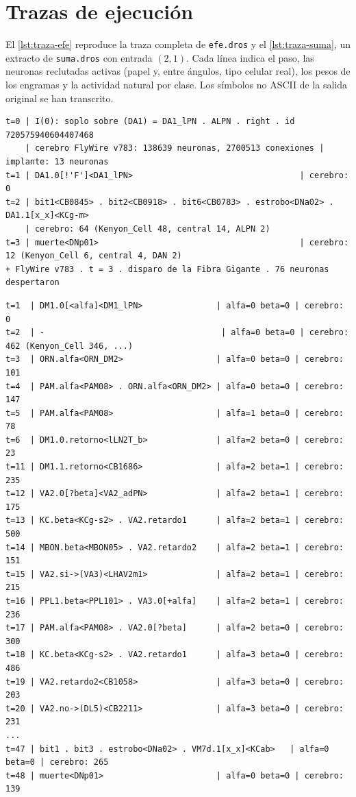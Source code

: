 \documentclass[11pt,a4paper]{article}
\theoremstyle{plain}
\theoremstyle{definition}
\theoremstyle{remark}
\begin{document}
\section{Trazas de ejecución}
\label{app:traza}

El \cref{lst:traza-efe} reproduce la traza completa de \texttt{efe.dros} y el
\cref{lst:traza-suma}, un extracto de \texttt{suma.dros} con entrada $(2,1)$.
Cada línea indica el paso, las neuronas reclutadas activas (papel y, entre
ángulos, tipo celular real), los pesos de los engramas y la actividad natural
por clase. Los símbolos no ASCII de la salida original se han transcrito.

\begin{lstlisting}[caption={Traza completa de \texttt{efe.dros}.},label={lst:traza-efe}]
t=0 | I(0): soplo sobre (DA1) = DA1_lPN . ALPN . right . id 720575940604407468
    | cerebro FlyWire v783: 138639 neuronas, 2700513 conexiones | implante: 13 neuronas
t=1 | DA1.0[!'F']<DA1_lPN>                                  | cerebro: 0
t=2 | bit1<CB0845> . bit2<CB0918> . bit6<CB0783> . estrobo<DNa02> . DA1.1[x_x]<KCg-m>
    | cerebro: 64 (Kenyon_Cell 48, central 14, ALPN 2)
t=3 | muerte<DNp01>                                         | cerebro: 12 (Kenyon_Cell 6, central 4, DAN 2)
+ FlyWire v783 . t = 3 . disparo de la Fibra Gigante . 76 neuronas despertaron
\end{lstlisting}

\begin{lstlisting}[caption={Extracto de la traza de \texttt{suma.dros} con entrada $(2,1)$.},label={lst:traza-suma}]
t=1  | DM1.0[<alfa]<DM1_lPN>               | alfa=0 beta=0 | cerebro: 0
t=2  | -                                    | alfa=0 beta=0 | cerebro: 462 (Kenyon_Cell 346, ...)
t=3  | ORN.alfa<ORN_DM2>                   | alfa=0 beta=0 | cerebro: 101
t=4  | PAM.alfa<PAM08> . ORN.alfa<ORN_DM2> | alfa=0 beta=0 | cerebro: 147
t=5  | PAM.alfa<PAM08>                     | alfa=1 beta=0 | cerebro: 78
t=6  | DM1.0.retorno<lLN2T_b>              | alfa=2 beta=0 | cerebro: 23
t=11 | DM1.1.retorno<CB1686>               | alfa=2 beta=1 | cerebro: 235
t=12 | VA2.0[?beta]<VA2_adPN>              | alfa=2 beta=1 | cerebro: 175
t=13 | KC.beta<KCg-s2> . VA2.retardo1      | alfa=2 beta=1 | cerebro: 500
t=14 | MBON.beta<MBON05> . VA2.retardo2    | alfa=2 beta=1 | cerebro: 151
t=15 | VA2.si->(VA3)<LHAV2m1>              | alfa=2 beta=1 | cerebro: 215
t=16 | PPL1.beta<PPL101> . VA3.0[+alfa]    | alfa=2 beta=1 | cerebro: 236
t=17 | PAM.alfa<PAM08> . VA2.0[?beta]      | alfa=2 beta=0 | cerebro: 300
t=18 | KC.beta<KCg-s2> . VA2.retardo1      | alfa=3 beta=0 | cerebro: 486
t=19 | VA2.retardo2<CB1058>                | alfa=3 beta=0 | cerebro: 203
t=20 | VA2.no->(DL5)<CB2211>               | alfa=3 beta=0 | cerebro: 231
...
t=47 | bit1 . bit3 . estrobo<DNa02> . VM7d.1[x_x]<KCab>   | alfa=0 beta=0 | cerebro: 265
t=48 | muerte<DNp01>                       | alfa=0 beta=0 | cerebro: 139
\end{lstlisting}
\end{document}
